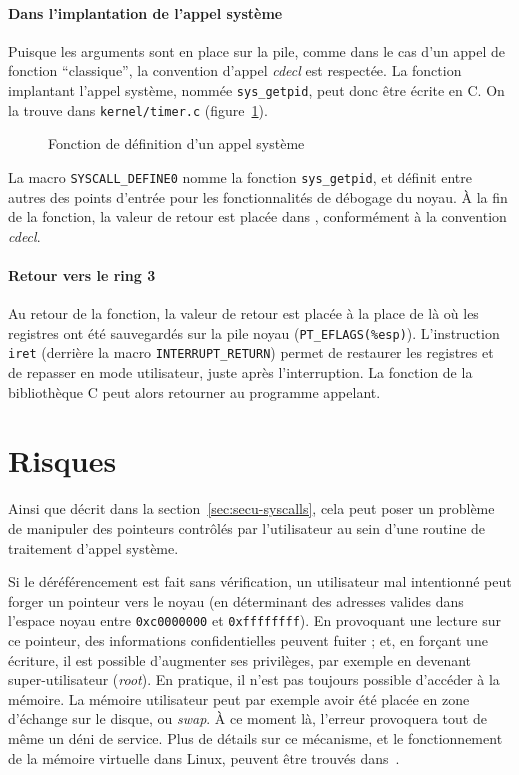 \paragraph{Dans l'implantation de l'appel système}

Puisque les arguments sont en place sur la pile, comme dans le cas d'un appel de
fonction \enquote{classique}, la convention d'appel \emph{cdecl} est respectée.
La fonction implantant l'appel système, nommée \texttt{sys\_getpid}, peut donc
être écrite en C. On la trouve dans \texttt{kernel/timer.c}
(figure~\ref{fig:syscall-def}).

\begin{figure}[h]
    \caption{Fonction de définition d'un appel système}
    \label{fig:syscall-def}
\end{figure}

La macro \texttt{SYSCALL\_DEFINE0} nomme la fonction \texttt{sys\_getpid}, et
définit entre autres des points d'entrée pour les fonctionnalités de débogage du
noyau. À la fin de la fonction, la valeur de retour est placée dans \eax,
conformément à la convention \emph{cdecl}.

\paragraph{Retour vers le ring 3}

Au retour de la fonction, la valeur de retour est placée à la place de \eax{} là
où les registres ont été sauvegardés sur la pile noyau
(\texttt{PT\_EFLAGS(\%esp)}). %
L'instruction \texttt{iret} (derrière la macro
\texttt{INTERRUPT\_RETURN}) permet de restaurer les registres et de repasser en
mode utilisateur, juste après l'interruption. La fonction de la bibliothèque C
peut alors retourner au programme appelant.

\section{Risques}

Ainsi que décrit dans la section~\ref{sec:secu-syscalls}, cela peut poser un
problème de manipuler des pointeurs contrôlés par l'utilisateur au sein d'une
routine de traitement d'appel système.

Si le déréférencement est fait sans vérification, un utilisateur mal intentionné
peut forger un pointeur vers le noyau (en déterminant des adresses valides dans
l'espace noyau entre \texttt{0xc0000000} et \texttt{0xffffffff}). En provoquant
une lecture sur ce pointeur, des informations confidentielles peuvent fuiter ;
et, en forçant une écriture, il est possible d'augmenter ses privilèges, par
exemple en devenant super-utilisateur (\emph{root}). En pratique, il n'est pas
toujours possible d'accéder à la mémoire. La mémoire utilisateur peut par
exemple avoir été placée en zone d'échange sur le disque, ou \emph{swap}. À ce
moment là, l'erreur provoquera tout de même un déni de service. Plus de détails
sur ce mécanisme, et le fonctionnement de la mémoire virtuelle dans Linux,
peuvent être trouvés dans~\cite{userspaceaccess}.


